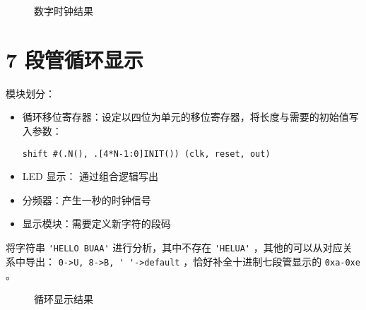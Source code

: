 \documentclass[lang=cn,11pt,a4paper,cite=authoryear]{elegantpaper}
\begin{document}
\begin{figure}
    \centering
    \caption{数字时钟结果}\label{04} 
     \hfill 
     \hfill
     \hfill 
     \bigskip 
\end{figure}

\section{7 段管循环显示}

模块划分：

\begin{itemize}
    \item 循环移位寄存器：设定以四位为单元的移位寄存器，将长度与需要的初始值写入参数：

    \lstinline{shift #(.N(), .[4*N-1:0]INIT()) (clk, reset, out)} 
    \item LED 显示： 通过组合逻辑写出
    \item 分频器：产生一秒的时钟信号
    \item 显示模块：需要定义新字符的段码
\end{itemize}

将字符串 \lstinline{'HELLO BUAA'} 进行分析，其中不存在 \lstinline{'HELUA'} ，其他的可以从对应关系中导出： \lstinline{0->U, 8->B, ' '->default} ，恰好补全十进制七段管显示的 \lstinline{0xa-0xe} 。

\begin{figure}
    \centering
    \caption{循环显示结果}\label{05} 
     \hfill 
     \hfill 
     \hfill 
    
    \bigskip

     \hfill 
     \hfill 
     \hfill 
    
    \bigskip  
    
     \hfill 
     \hfill 
     \hfill 
\end{figure}
\end{document}
